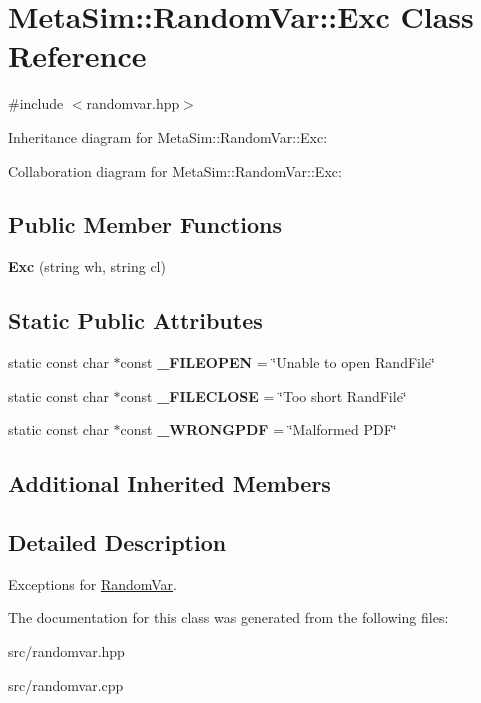 \hypertarget{classMetaSim_1_1RandomVar_1_1Exc}{}\section{Meta\+Sim\+:\+:Random\+Var\+:\+:Exc Class Reference}
\label{classMetaSim_1_1RandomVar_1_1Exc}


{\ttfamily \#include $<$randomvar.\+hpp$>$}



Inheritance diagram for Meta\+Sim\+:\+:Random\+Var\+:\+:Exc\+:


Collaboration diagram for Meta\+Sim\+:\+:Random\+Var\+:\+:Exc\+:
\subsection*{Public Member Functions}
\begin{DoxyCompactItemize}
\item 
{\bfseries Exc} (string wh, string cl)
\end{DoxyCompactItemize}
\subsection*{Static Public Attributes}
\begin{DoxyCompactItemize}
\item 
static const char $\ast$const {\bfseries \+\_\+\+F\+I\+L\+E\+O\+P\+EN} = \char`\"{}Unable to open Rand\+File\char`\"{}
\item 
static const char $\ast$const {\bfseries \+\_\+\+F\+I\+L\+E\+C\+L\+O\+SE} = \char`\"{}Too short Rand\+File\char`\"{}
\item 
static const char $\ast$const {\bfseries \+\_\+\+W\+R\+O\+N\+G\+P\+DF} = \char`\"{}Malformed P\+DF\char`\"{}
\end{DoxyCompactItemize}
\subsection*{Additional Inherited Members}


\subsection{Detailed Description}
Exceptions for \hyperlink{classMetaSim_1_1RandomVar}{Random\+Var}. 

The documentation for this class was generated from the following files\+:\begin{DoxyCompactItemize}
\item 
src/randomvar.\+hpp\item 
src/randomvar.\+cpp\end{DoxyCompactItemize}
